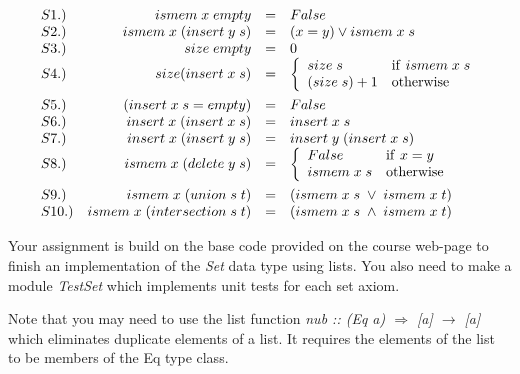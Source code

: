 \documentclass[11pt]{article}
\begin{document}
\[\begin{array}{lrcl}
S1.) & ismem\;x\; empty &=&False\\
S2.) & ismem\;x \;(insert\; y \; s) &=& (x = y) \vee ismem\; x \; s\\
S3.) & size \; empty &=& 0 \\
S4.) & size (insert\; x \;s) &=&
    \left\{ \begin{array}{ll} 
                 size \; s &{\mathrm{if\ }} ismem\; x\;s\\
                 (size\; s) + 1 & {\mathrm{otherwise}} \\
           \end{array}\right.\vspace{.06125in}\\
S5.) & (insert\; x\; s = empty) &=& False\\
S6.) & insert\; x\; (insert\; x\; s) &=& insert\; x\; s\\
S7.) & insert\; x\; (insert\; y\; s) &=& insert\; y\; (insert\; x\; s)\\
S8.) & ismem\;x \;(delete \; y \;s ) &=& 
    \left\{ \begin{array}{ll} 
                 False &{\mathrm{if\ }} x = y\\
                 ismem\; x\; s & {\mathrm{otherwise}} \\
           \end{array}\right.\vspace{.06125in}\\
S9.) & ismem\;x \;(union \; s \; t) &=& (ismem\;x \; s\; \vee \; ismem\;x \; t)  \\
S10.) & ismem\;x \;(intersection \; s \; t) &=& (ismem\;x \; s\; \wedge \; ismem\;x \; t)  \\
\end{array}\]



\begin{exercise}
Your assignment is build on the base code provided on the course web-page to
finish an implementation of the {\it{Set}} data type using lists.  You also
need to make a module {\em{TestSet}} which implements unit tests for each set
axiom.

Note that you may need to use the list function {\it{nub :: (Eq a) $\Rightarrow$ [a] $\rightarrow$
[a]}} which eliminates duplicate elements of a list.  It requires the elements
of the list to be members of the Eq type class.

\end{exercise}
\end{document}

